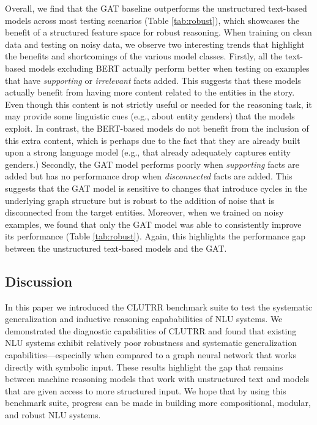 \documentclass[12pt]{article}
\begin{document}
Overall, we find that the GAT baseline outperforms the unstructured text-based models across most testing scenarios (Table \ref{tab:robust}), which showcases the benefit of a structured feature space for robust reasoning.
When training on clean data and testing on noisy data, we observe two interesting trends that highlight the benefits and shortcomings of the various model classes. Firstly, all the text-based models excluding BERT actually perform better when testing on examples that have {\em supporting} or {\em irrelevant} facts added. This suggests that these models actually benefit from having more content related to the entities in the story. Even though this content is not strictly useful or needed for the reasoning task, it may provide some linguistic cues (e.g., about entity genders) that the models exploit. In contrast, the BERT-based models do not benefit from the inclusion of this extra content, which is perhaps due to the fact that they are already built upon a strong language model (e.g., that already adequately captures entity genders.)
Secondly, the GAT model performs poorly when {\em supporting} facts are added but has no performance drop when {\em disconnected} facts are added. This suggests that the GAT model is sensitive to changes that introduce cycles in the underlying graph structure but is robust to the addition of noise that is disconnected from the target entities.
Moreover, when we trained on noisy examples, we found that only the GAT model was able to consistently improve its performance (Table \ref{tab:robust}).
Again, this highlights the performance gap between the unstructured text-based models and the GAT.

\subsection{Discussion}

In this paper we introduced the CLUTRR benchmark suite to test the systematic generalization and inductive reasoning capababilities of NLU systems.
We demonstrated the diagnostic capabilities of CLUTRR and found that existing NLU systems exhibit relatively poor robustness and systematic generalization capabilities---especially when compared to a graph neural network that works directly with symbolic input.
These results highlight the gap that remains between machine reasoning models that work with unstructured text and models that are given access to more structured input.
We hope that by using this benchmark suite, progress can be made in building more compositional, modular, and robust NLU systems.
\end{document}
